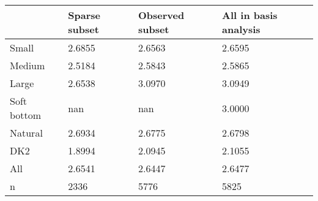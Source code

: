 \begin{tabular}{llll}
\toprule
 & Sparse subset & Observed subset & All in basis analysis \\
\midrule
Small & 2.6855 & 2.6563 & 2.6595 \\
Medium & 2.5184 & 2.5843 & 2.5865 \\
Large & 2.6538 & 3.0970 & 3.0949 \\
Soft bottom & nan & nan & 3.0000 \\
Natural & 2.6934 & 2.6775 & 2.6798 \\
DK2 & 1.8994 & 2.0945 & 2.1055 \\
All & 2.6541 & 2.6447 & 2.6477 \\
n & 2336 & 5776 & 5825 \\
\bottomrule
\end{tabular}
